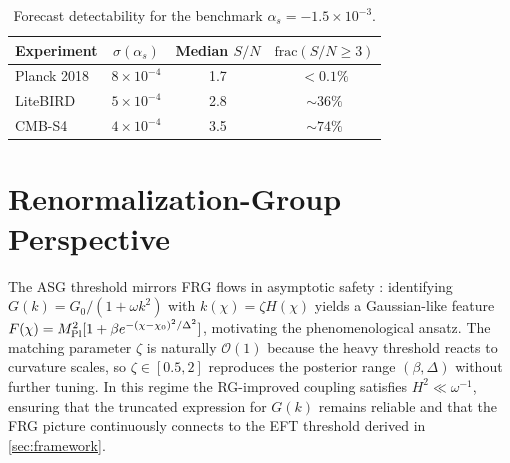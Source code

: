 \documentclass[11pt,a4paper]{article}
\begin{document}
\begin{table}[t]
    \centering
    \caption{Forecast detectability for the benchmark $\alpha_{s}=-1.5\times10^{-3}$.}
    \begin{tabular}{lccc}
        \toprule
        Experiment & $\sigma(\alpha_{s})$ & Median $S/N$ & $\mathrm{frac}(S/N\ge3)$ \\
        \midrule
        Planck 2018 & $8\times10^{-4}$ & 1.7 & $<0.1\%$ \\
        LiteBIRD & $5\times10^{-4}$ & 2.8 & $\sim36\%$ \\
        CMB-S4 & $4\times10^{-4}$ & 3.5 & $\sim74\%$ \\
        \bottomrule
    \end{tabular}
    \label{tab:forecasts}
\end{table}

\section{Renormalization-Group Perspective}
\label{sec:rg}
The ASG threshold mirrors FRG flows in asymptotic safety \cite{Saueressig2023}: identifying $G(k)=G_{0}/(1+\omega k^{2})$ with $k(\chi)=\zeta H(\chi)$ yields a Gaussian-like feature $F(\chi)=M_{\rm Pl}^{2}[1+\beta e^{-(\chi-\chi_{0})^{2}/\Delta^{2}}]$, motivating the phenomenological ansatz. The matching parameter $\zeta$ is naturally $\mathcal{O}(1)$ because the heavy threshold reacts to curvature scales, so $\zeta\in[0.5,2]$ reproduces the posterior range $(\beta,\Delta)$ without further tuning. In this regime the RG-improved coupling satisfies $H^{2}\ll \omega^{-1}$, ensuring that the truncated expression for $G(k)$ remains reliable and that the FRG picture continuously connects to the EFT threshold derived in \cref{sec:framework}.
\end{document}
